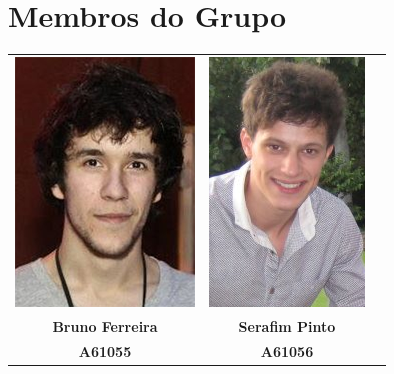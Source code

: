 \documentclass[a5paper,onecolumn, 11pt]{article}
\begin{document}
\section{Membros do Grupo}
\begin{center}
    \begin{tabular}{ccc}
        \includegraphics[scale=0.5]{bruno.png}&
        \includegraphics[scale=0.5]{serafim.png}\\
        
        \small{\textbf{Bruno Ferreira}}&
        \small{\textbf{Serafim Pinto}}\\
        \small{\textbf{A61055}}&
        \small{\textbf{A61056}}\\
    \end{tabular}
\end{center}
\end{document}
